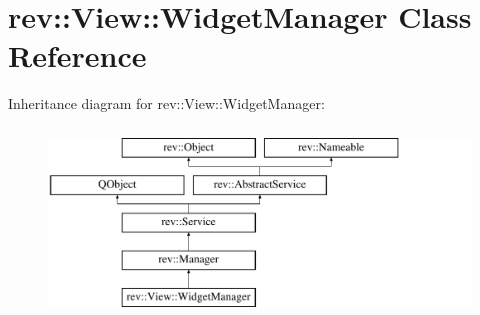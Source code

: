 \hypertarget{classrev_1_1_view_1_1_widget_manager}{}\section{rev\+::View\+::Widget\+Manager Class Reference}
\label{classrev_1_1_view_1_1_widget_manager}
Inheritance diagram for rev\+::View\+::Widget\+Manager\+:\begin{figure}[H]
\begin{center}
\leavevmode
\includegraphics[height=5.000000cm]{classrev_1_1_view_1_1_widget_manager}
\end{center}
\end{figure}
